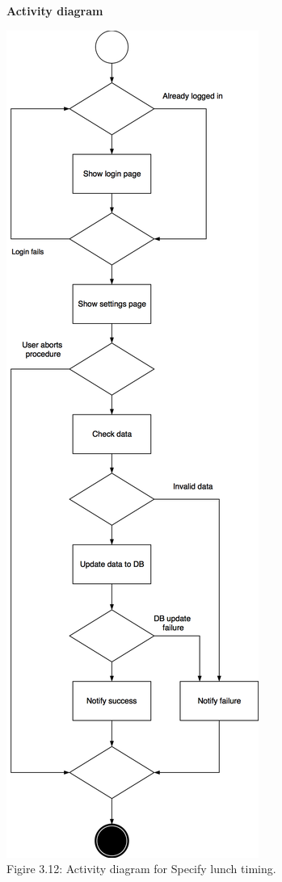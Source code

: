 \documentclass{article}
\begin{document}
	\newpage
	\noindent
	\textbf{Activity diagram} \\
	
	\begin{center}
		\includegraphics[scale=0.24]{img/diagrams/specify_lunch_timing_ad.png} \\ \bigskip
		Figire 3.12: Activity diagram for Specify lunch timing.
	\end{center}
\end{document}
